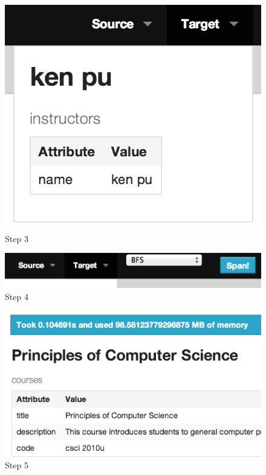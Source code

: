 		\begin{figure}[H]
			\centering
			\includegraphics[scale=0.5]{figures/images/step-3}
			
			\caption{Step 3}
			\label{fig:webui-step-3}
		\end{figure}
		
		\begin{figure}[H]
			\centering
			\includegraphics[scale=0.5]{figures/images/step-4}
			
			\caption{Step 4}
			\label{fig:webui-step-4}
		\end{figure}
		
		\begin{figure}[H]
			\centering
			\includegraphics[scale=0.5]{figures/images/step-5}
			
			\caption{Step 5}
			\label{fig:webui-step-5}
		\end{figure}
		
